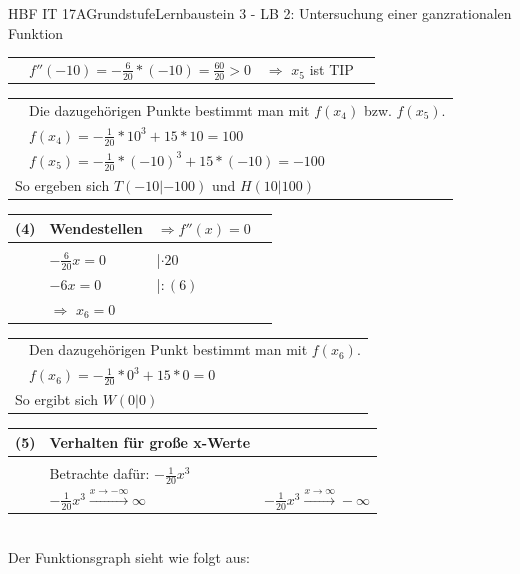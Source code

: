 \documentclass[oneside,openany,headings=optiontotoc,11pt,numbers=noenddot]{scrreprt}
\begin{document}
\begin{worksheet}{HBF IT 17A}{Grundstufe}{Lernbaustein 3 - LB 2: Untersuchung einer ganzrationalen Funktion}
\begin{framed}
\begin{tabularx}{\textwidth}{lXXl}
				 & \(f''(-10) = -\frac{6}{20}*(-10) = \frac{60}{20} > 0\) & \(\Rightarrow\) \colorbox{green!10}{\(x_5\) ist TIP}\\
			\end{tabularx}
			\begin{tabularx}{\textwidth}{ll}
				& Die dazugehörigen Punkte bestimmt man mit \(f(x_4)\) bzw. \(f(x_5)\).\\
				& \(f(x_4) = -\frac{1}{20}*10^3 +15*10 = 100\)\\
				& \(f(x_5) = -\frac{1}{20}*(-10)^3 +15*(-10) = -100\)\\
				\multicolumn{2}{l}{So ergeben sich \colorbox{blue!5}{\(T(-10|-100)\)} und \colorbox{blue!5}{\(H(10|100)\)}}\\
				\hline\hline
			\end{tabularx}
			\begin{tabularx}{\textwidth}{lXXl}
				\\
				(4) & Wendestellen & \(\Rightarrow f''(x) = 0\)\\
				\hline\\
				& \(-\frac{6}{20}x = 0\) & |\(\cdot20\)\\
				& \(-6x = 0\) & |\(:(6)\)\\
				& \(\Rightarrow\) \colorbox{green!10}{\(x_6 = 0\)}\\
			\end{tabularx}
			\begin{tabularx}{\textwidth}{ll}
				& Den dazugehörigen Punkt bestimmt man mit \(f(x_6)\).\\
				& \(f(x_6) = -\frac{1}{20}*0^3 +15*0 = 0\)\\
				\multicolumn{2}{l}{So ergibt sich \colorbox{blue!5}{\(W(0|0)\)}}\\
				\hline\hline
			\end{tabularx}
			\begin{tabularx}{\textwidth}{lXX}
				(5) & Verhalten für große x-Werte\\
				\hline\\
				& Betrachte dafür: \(-\frac{1}{20}x^3\)\\
				& \colorbox{green!10}{\(-\frac{1}{20}x^3\xrightarrow{x\rightarrow-\infty}\infty\)} & \colorbox{green!10}{\(-\frac{1}{20}x^3\xrightarrow{x\rightarrow\infty}-\infty\)}\\
			\end{tabularx}
			\\
			Der Funktionsgraph sieht wie folgt aus:\\
			\par

\end{framed}
\end{worksheet}
\end{document}
